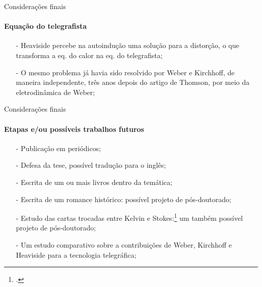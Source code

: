 \documentclass[aspectratio=169]{beamer}
\begin{document}

\begin{frame}{Considerações finais}
\framesubtitle{Equação do telegrafista}
\begin{itemize}
	\item [-] Heaviside percebe na autoindução uma solução para a distorção, o que transforma a eq. do calor na eq. do telegrafista;\cite{heaviside1876}
	\item [-] O mesmo problema já havia sido resolvido por Weber e Kirchhoff,\cite{kirchhoff1857} de maneira independente, três anos depois do artigo de Thomson, por meio da eletrodinâmica de Weber;  
\end{itemize}
\end{frame}

\begin{frame}{Considerações finais}
\framesubtitle{Etapas e/ou possíveis trabalhos futuros}
\begin{itemize}
	\item[-] Publicação em periódicos;
	\item[-] Defesa da tese, possível tradução para o inglês;	 
	\item[-] Escrita de um ou mais livros dentro da temática; 
	\item[-] Escrita de um romance histórico: possível projeto de pós-doutorado;
	\item[-] Estudo das cartas trocadas entre Kelvin e Stokes:\footcite{wilson1990} um também possível projeto de pós-doutorado; 
	\item[-] Um estudo comparativo sobre a contribuições de Weber, Kirchhoff e Heaviside para a tecnologia telegráfica;
\end{itemize}
\end{frame}
\end{document}
